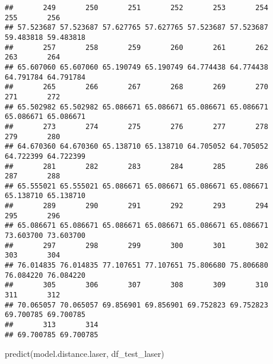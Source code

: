 \documentclass[
]{article}
\newenvironment{Shaded}{\begin{snugshade}}{\end{snugshade}}
\newcommand{\FunctionTok}[1]{\textcolor[rgb]{0.00,0.00,0.00}{#1}}
\newcommand{\NormalTok}[1]{#1}
\begin{document}
\begin{verbatim}
##       249       250       251       252       253       254       255       256 
## 57.523687 57.523687 57.627765 57.627765 57.523687 57.523687 59.483818 59.483818 
##       257       258       259       260       261       262       263       264 
## 65.607060 65.607060 65.190749 65.190749 64.774438 64.774438 64.791784 64.791784 
##       265       266       267       268       269       270       271       272 
## 65.502982 65.502982 65.086671 65.086671 65.086671 65.086671 65.086671 65.086671 
##       273       274       275       276       277       278       279       280 
## 64.670360 64.670360 65.138710 65.138710 64.705052 64.705052 64.722399 64.722399 
##       281       282       283       284       285       286       287       288 
## 65.555021 65.555021 65.086671 65.086671 65.086671 65.086671 65.138710 65.138710 
##       289       290       291       292       293       294       295       296 
## 65.086671 65.086671 65.086671 65.086671 65.086671 65.086671 73.603700 73.603700 
##       297       298       299       300       301       302       303       304 
## 76.014835 76.014835 77.107651 77.107651 75.806680 75.806680 76.084220 76.084220 
##       305       306       307       308       309       310       311       312 
## 70.065057 70.065057 69.856901 69.856901 69.752823 69.752823 69.700785 69.700785 
##       313       314 
## 69.700785 69.700785
\end{verbatim}

\begin{Shaded}
\begin{Highlighting}[]
\FunctionTok{predict}\NormalTok{(model.distance.laser, df\_test\_laser)}
\end{Highlighting}
\end{Shaded}
\end{document}
